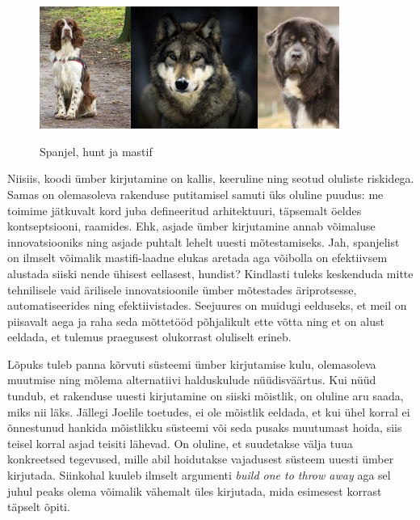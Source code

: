\begin{figure}[htp]
	\begin{center}
		\includegraphics[height=4cm]{spaniel.jpg}\includegraphics[height=4cm]{wolf.jpg}\includegraphics[height=4cm]{mastiff.jpg}
		\caption{Spanjel, hunt ja mastif}
	\end{center}
\end{figure}

Niisiis, koodi ümber kirjutamine on kallis, keeruline ning seotud oluliste riskidega. Samas on olemasoleva rakenduse putitamisel samuti üks oluline puudus: me toimime jätkuvalt kord juba defineeritud arhitektuuri, täpsemalt öeldes kontseptsiooni, raamides. Ehk, asjade ümber kirjutamine annab võimaluse innovatsiooniks ning asjade puhtalt lehelt uuesti mõtestamiseks. Jah, spanjelist on ilmselt võimalik mastifi-laadne elukas aretada aga võibolla on efektiivsem alustada siiski nende ühisest eellasest, hundist? Kindlasti tuleks keskenduda mitte tehnilisele vaid ärilisele innovatsioonile ümber mõtestades äriprotsesse, automatiseerides ning efektiivistades. Seejuures on muidugi eelduseks, et meil on piisavalt aega ja raha seda mõttetööd põhjalikult ette võtta ning et on alust eeldada, et tulemus praegusest olukorrast oluliselt erineb.

Lõpuks tuleb panna kõrvuti süsteemi ümber kirjutamise kulu, olemasoleva muutmise ning mõlema alternatiivi halduskulude nüüdisväärtus. Kui nüüd tundub, et rakenduse uuesti kirjutamine on siiski mõistlik, on oluline aru saada, miks nii läks. Jällegi Joelile toetudes, ei ole mõistlik eeldada, et kui ühel korral ei õnnestunud hankida mõistlikku süsteemi või seda pusaks muutumast hoida, siis teisel korral asjad teisiti lähevad. On oluline, et suudetakse välja tuua konkreetsed tegevused, mille abil hoidutakse vajadusest süsteem uuesti ümber kirjutada. Siinkohal kuuleb ilmselt argumenti \emph{build one to throw away} aga sel juhul peaks olema võimalik vähemalt üles kirjutada, mida esimesest korrast täpselt õpiti.

